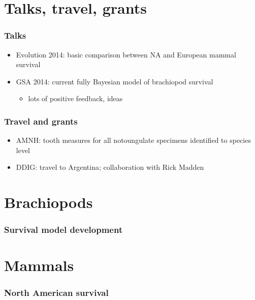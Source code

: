 \documentclass{beamer}
\begin{document}
\begin{frame}
  \tableofcontents
\end{frame}

\section{Talks, travel, grants}
\begin{frame}
  \frametitle{Talks}

  \begin{itemize}
    \item Evolution 2014: basic comparison between NA and European mammal survival 
    \item GSA 2014: current fully Bayesian model of brachiopod survival
      \begin{itemize}
        \item lots of positive feedback, ideas
      \end{itemize}
  \end{itemize}
\end{frame}

\begin{frame}
  \frametitle{Travel and grants}

  \begin{itemize}
    \item AMNH: tooth measures for all notoungulate specimens identified to species level
    \item DDIG: travel to Argentina; collaboration with Rick Madden
  \end{itemize}
\end{frame}


\section{Brachiopods}
\begin{frame}
  \frametitle{Survival model development}
\end{frame}

\section{Mammals}
\begin{frame}
  \frametitle{North American survival}
\end{frame}
\end{document}
